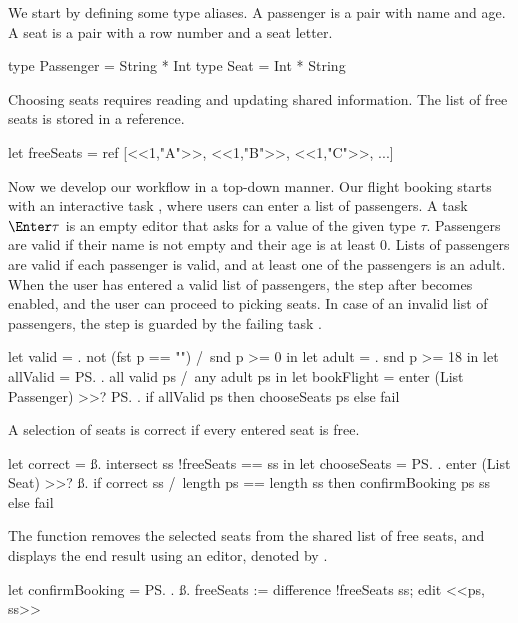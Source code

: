 \begin{example}
\label{exm:flight-booking}

We start by defining some type aliases.
A passenger is a pair with name and age.
A seat is a pair with a row number and a seat letter.
\begin{TASK}
  type Passenger = String * Int
  type Seat = Int * String
\end{TASK}

Choosing seats requires reading and updating shared information.
The list of free seats is stored in a reference. %
\begin{TASK}
  let freeSeats = ref [<<1,"A">>, <<1,"B">>, <<1,"C">>, ...]
\end{TASK}

Now we develop our workflow in a top-down manner.
Our flight booking starts with an interactive task , where users can enter a list of passengers.
A task $\Enter \tau$ is an empty editor that asks for a value of the given type $\tau$.
Passengers are valid if their name is not empty and their age is at least 0.
Lists of passengers are valid if each passenger is valid, and at least one of the passengers is an adult.
When the user has entered a valid list of passengers, the step after  becomes enabled,
and the user can proceed to picking seats.
In case of an invalid list of passengers,
the step is guarded by the failing task .
\begin{TASK}
  let valid = \p. not (fst p == "") /\ snd p >= 0 in
  let adult = \p. snd p >= 18 in
  let allValid = \ps. all valid ps /\ any adult ps in
  let bookFlight = enter (List Passenger) >>? \ps.
    if allValid ps then chooseSeats ps else fail
\end{TASK}
A selection of seats is correct if every entered seat is free.
\begin{TASK}
  let correct = \ss. intersect ss !freeSeats == ss in
  let chooseSeats = \ps. enter (List Seat) >>? \ss.
    if correct ss /\ length ps == length ss
      then confirmBooking ps ss else fail
\end{TASK}

The function  removes the selected seats from the shared list of free seats,
and displays the end result using an editor, denoted by .
\begin{TASK}
  let confirmBooking = \ps. \ss.
    freeSeats := difference !freeSeats ss; edit <<ps, ss>>
\end{TASK}


\end{example}
